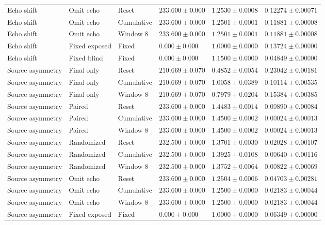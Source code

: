 \begin{longtable}{@{}llllll@{}}
Echo shift & Omit echo & Reset & $233.600 \pm 0.000$ & $1.2530 \pm 0.0008$ & $0.12274 \pm 0.00071$ \\
Echo shift & Omit echo & Cumulative & $233.600 \pm 0.000$ & $1.2501 \pm 0.0001$ & $0.11881 \pm 0.00008$ \\
Echo shift & Omit echo & Window 8 & $233.600 \pm 0.000$ & $1.2501 \pm 0.0001$ & $0.11881 \pm 0.00008$ \\
Echo shift & Fixed exposed & Fixed & $0.000 \pm 0.000$ & $1.0000 \pm 0.0000$ & $0.13724 \pm 0.00000$ \\
Echo shift & Fixed blind & Fixed & $0.000 \pm 0.000$ & $1.1500 \pm 0.0000$ & $0.04849 \pm 0.00000$ \\
Source asymmetry & Final only & Reset & $210.669 \pm 0.070$ & $0.4852 \pm 0.0054$ & $0.23042 \pm 0.00181$ \\
Source asymmetry & Final only & Cumulative & $210.669 \pm 0.070$ & $1.0058 \pm 0.0389$ & $0.10114 \pm 0.00535$ \\
Source asymmetry & Final only & Window 8 & $210.669 \pm 0.070$ & $0.7979 \pm 0.0204$ & $0.15384 \pm 0.00385$ \\
Source asymmetry & Paired & Reset & $233.600 \pm 0.000$ & $1.4483 \pm 0.0014$ & $0.00890 \pm 0.00084$ \\
Source asymmetry & Paired & Cumulative & $233.600 \pm 0.000$ & $1.4500 \pm 0.0002$ & $0.00024 \pm 0.00013$ \\
Source asymmetry & Paired & Window 8 & $233.600 \pm 0.000$ & $1.4500 \pm 0.0002$ & $0.00024 \pm 0.00013$ \\
Source asymmetry & Randomized & Reset & $232.500 \pm 0.000$ & $1.3701 \pm 0.0030$ & $0.02028 \pm 0.00107$ \\
Source asymmetry & Randomized & Cumulative & $232.500 \pm 0.000$ & $1.3925 \pm 0.0108$ & $0.00640 \pm 0.00116$ \\
Source asymmetry & Randomized & Window 8 & $232.500 \pm 0.000$ & $1.3752 \pm 0.0064$ & $0.00822 \pm 0.00069$ \\
Source asymmetry & Omit echo & Reset & $233.600 \pm 0.000$ & $1.2504 \pm 0.0006$ & $0.04703 \pm 0.00281$ \\
Source asymmetry & Omit echo & Cumulative & $233.600 \pm 0.000$ & $1.2500 \pm 0.0000$ & $0.02183 \pm 0.00044$ \\
Source asymmetry & Omit echo & Window 8 & $233.600 \pm 0.000$ & $1.2500 \pm 0.0000$ & $0.02183 \pm 0.00044$ \\
Source asymmetry & Fixed exposed & Fixed & $0.000 \pm 0.000$ & $1.0000 \pm 0.0000$ & $0.06349 \pm 0.00000$ \\

\end{longtable}
